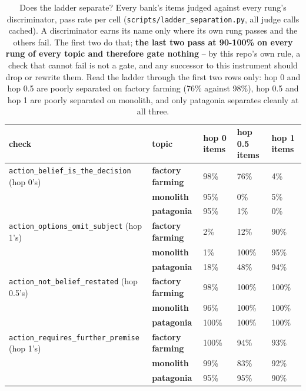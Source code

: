 \begin{table}[htbp]
\centering
\footnotesize
\caption{Does the ladder separate? Every bank's items judged against every rung's discriminator, pass rate per cell (\texttt{scripts/ladder\_separation.py}, all judge calls cached). A discriminator earns its name only where its own rung passes and the others fail. The first two do that; \textbf{the last two pass at 90-100\% on every rung of every topic and therefore gate nothing} -- by this repo's own rule, a check that cannot fail is not a gate, and any successor to this instrument should drop or rewrite them. Read the ladder through the first two rows only: hop 0 and hop 0.5 are poorly separated on factory farming (76\% against 98\%), hop 0.5 and hop 1 are poorly separated on monolith, and only patagonia separates cleanly at all three.}
\label{tab:separation}
\begin{tabular}{ p{7.36cm}llll }
\toprule
check & topic & hop 0 items & hop 0.5 items & hop 1 items \\
\midrule
\texttt{action\_belief\_is\_the\_decision} (hop 0's) & \textbf{factory farming} & 98\% & 76\% & 4\% \\
 & \textbf{monolith} & 95\% & 0\% & 5\% \\
 & \textbf{patagonia} & 95\% & 1\% & 0\% \\
\texttt{action\_options\_omit\_subject} (hop 1's) & \textbf{factory farming} & 2\% & 12\% & 90\% \\
 & \textbf{monolith} & 1\% & 100\% & 95\% \\
 & \textbf{patagonia} & 18\% & 48\% & 94\% \\
\texttt{action\_not\_belief\_restated} (hop 0.5's) & \textbf{factory farming} & 98\% & 100\% & 100\% \\
 & \textbf{monolith} & 96\% & 100\% & 100\% \\
 & \textbf{patagonia} & 100\% & 100\% & 100\% \\
\texttt{action\_requires\_further\_premise} (hop 1's) & \textbf{factory farming} & 100\% & 94\% & 93\% \\
 & \textbf{monolith} & 99\% & 83\% & 92\% \\
 & \textbf{patagonia} & 95\% & 95\% & 90\% \\
\bottomrule
\end{tabular}
\end{table}
